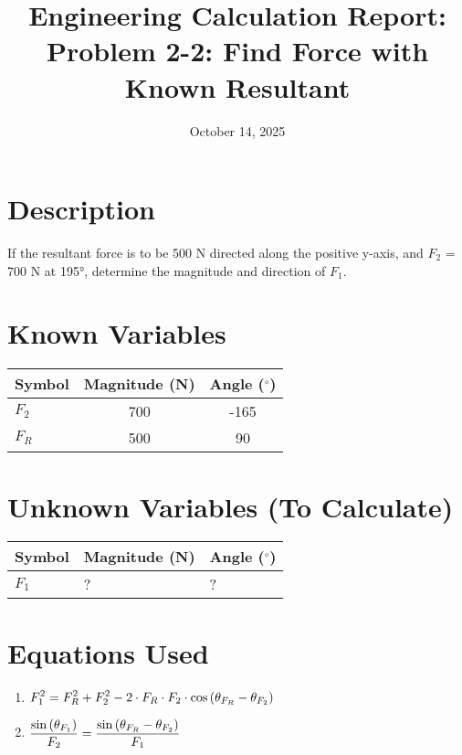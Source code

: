 \documentclass[11pt,a4paper]{article}
\title{Engineering Calculation Report: Problem 2-2: Find Force with Known Resultant}
\date{October 14, 2025}
\begin{document}
\maketitle

\section*{Description}
\noindent
\begin{minipage}{\textwidth}
If the resultant force is to be 500 N directed along the positive y-axis, and $F_{2}$ = 700 N at 195°, determine the magnitude and direction of $F_{1}$.
\end{minipage}
\par

\section{Known Variables}

\begin{longtable}{lSS}
\toprule
Symbol & {Magnitude (N)} & {Angle ($^\circ$)} \\
\midrule
\endhead
$F_{2}$ & 700 & -165 \\
$F_{R}$ & 500 & 90 \\
\bottomrule
\end{longtable}

\section{Unknown Variables (To Calculate)}

\begin{longtable}{lll}
\toprule
Symbol & Magnitude (N) & Angle ($^\circ$) \\
\midrule
\endhead
$F_{1}$ & ? & ? \\
\bottomrule
\end{longtable}

\section{Equations Used}

\begin{enumerate}
\item $\displaystyle\Large F_{1}^{2} = F_{R}^{2} + F_{2}^{2} - 2 \cdot F_R \cdot F_2 \cdot \cos{(\theta_{F_{R}} - \theta_{F_{2}})}$
\item $\displaystyle\Large \frac{\sin{(\theta_{F_{1}})}}{F_2} = \frac{\sin{(\theta_{F_{R}} - \theta_{F_{2}})}}{F_1}$
\end{enumerate}
\end{document}
